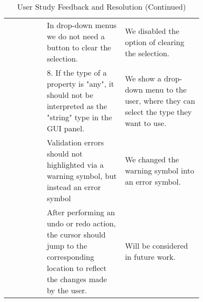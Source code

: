 \begin{table*}
\begin{tabular}{|c|p{0.4\linewidth}|p{0.4\linewidth}|}
        \cline{2-3}
        & In drop-down menus we do not need a button to clear the selection. & 
        We disabled the option of clearing the selection. \\
        \cline{2-3}
        & 8. If the type of a property is "any", it should not be interpreted as the "string" type in the GUI panel. & 
        We show a drop-down menu to the user, where they can select the type they want to use. \\
        \cline{2-3}
        & Validation errors should not highlighted via a warning symbol, but instead an error symbol & 
        We changed the warning symbol into an error symbol. \\
        \cline{2-3}
        & After performing an undo or redo action, the cursor should jump to the corresponding location to reflect the changes made by the user.& 
        Will be considered in future work. \\
        \hline
    \end{tabular}
    \caption* {User Study Feedback and Resolution (Continued)} \label{tab:user_study1}
\end{table*}


\clearpage %

